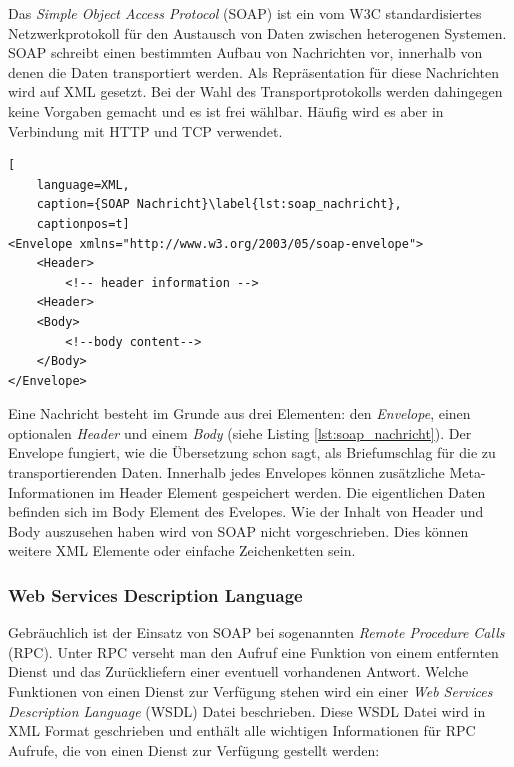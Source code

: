 Das \emph{Simple Object Access Protocol}\cite{Mitra2007} (SOAP) ist ein vom W3C standardisiertes Netzwerkprotokoll für den Austausch von Daten zwischen heterogenen Systemen. SOAP schreibt einen bestimmten Aufbau von Nachrichten vor, innerhalb von denen die Daten transportiert werden. Als Repräsentation für diese Nachrichten wird auf XML gesetzt. Bei der Wahl des Transportprotokolls werden dahingegen keine Vorgaben gemacht und es ist frei wählbar. Häufig wird es aber in Verbindung mit HTTP und TCP verwendet. 

\medskip

\begin{lstlisting}[
    language=XML,
    caption={SOAP Nachricht}\label{lst:soap_nachricht},
    captionpos=t]
<Envelope xmlns="http://www.w3.org/2003/05/soap-envelope">
    <Header>
        <!-- header information -->
    <Header> 
    <Body>
        <!--body content-->
    </Body>
</Envelope>
\end{lstlisting}

Eine Nachricht besteht im Grunde aus drei Elementen: den \emph{Envelope}, einen optionalen \emph{Header} und einem \emph{Body} (siehe Listing \ref{lst:soap_nachricht}). Der Envelope fungiert, wie die Übersetzung schon sagt, als Briefumschlag für die zu transportierenden Daten. Innerhalb jedes Envelopes können zusätzliche Meta-Informationen im Header Element gespeichert werden. Die eigentlichen Daten befinden sich im Body Element des Evelopes. Wie der Inhalt von Header und Body auszusehen haben wird von SOAP nicht vorgeschrieben. Dies können weitere XML Elemente oder einfache Zeichenketten sein. 

\subsubsection{Web Services Description Language} %
\label{ssub:wsdl}


Gebräuchlich ist der Einsatz von SOAP bei sogenannten \emph{Remote Procedure  Calls} (RPC). Unter RPC verseht man den Aufruf eine Funktion von einem entfernten Dienst und das Zurückliefern einer eventuell vorhandenen Antwort. Welche Funktionen von einen Dienst zur Verfügung stehen wird ein einer \emph{Web Services Description Language}\cite{wsdl2001} (WSDL) Datei beschrieben. Diese WSDL Datei wird in XML Format geschrieben und enthält alle wichtigen Informationen für RPC Aufrufe, die von einen Dienst zur Verfügung gestellt werden: 

